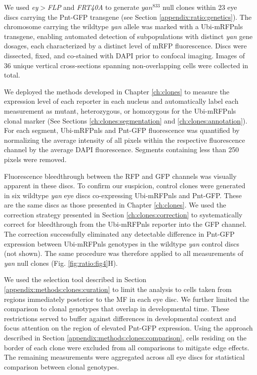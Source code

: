 We used \textit{ey$>$FLP} and \textit{FRT40A} to generate $yan^{833}$ null clones within 23 eye discs carrying the Pnt-GFP transgene (see Section \ref{appendix:ratio:genetics}). The chromosome carrying the wildtype \textit{yan} allele was marked with a Ubi-mRFPnls transgene, enabling automated detection of subpopulations with distinct \textit{yan} gene dosages, each characterized by a distinct level of mRFP fluorescence. Discs were dissected, fixed, and co-stained with DAPI prior to confocal imaging. Images of 36 unique vertical cross-sections spanning non-overlapping cells were collected in total. 

We deployed the methods developed in Chapter \ref{ch:clones} to measure the expression level of each reporter in each nucleus and automatically label each measurement as mutant, heterozygous, or homozygous for the Ubi-mRFPnls clonal marker (See Sections \ref{ch:clones:segmentation} and \ref{ch:clones:annotation}). For each segment, Ubi-mRFPnls and Pnt-GFP fluorescence was quantified by normalizing the average intensity of all pixels within the respective fluorescence channel by the average DAPI fluorescence. Segments containing less than 250 pixels were removed. 

Fluorescence bleedthrough between the RFP and GFP channels was visually apparent in these discs. To confirm our suspicion, control clones were generated in six wildtype \textit{yan} eye discs co-expressing Ubi-mRFPnls and Pnt-GFP. These are the same discs as those presented in Chapter \ref{ch:clones}. We used the correction strategy presented in Section \ref{ch:clones:correction} to systematically correct for bleedthrough from the Ubi-mRFPnls reporter into the GFP channel. The correction successfully eliminated any detectable difference in Pnt-GFP expression between Ubi-mRFPnls genotypes in the wildtype \textit{yan} control discs (not shown). The same procedure was therefore applied to all measurements of \textit{yan} null clones (Fig. \ref{fig:ratio:fig4}H).

We used the selection tool described in Section \ref{appendix:methods:clones:curation} to limit the analysis to cells taken from regions immediately posterior to the MF in each eye disc. We further limited the comparison to clonal genotypes that overlap in developmental time. These restrictions served to buffer against differences in developmental context and focus attention on the region of elevated Pnt-GFP expression. Using the approach described in Section \ref{appendix:methods:clones:comparison}, cells residing on the border of each clone were excluded from all comparisons to mitigate edge effects. The remaining measurements were aggregated across all eye discs for statistical comparison between clonal genotypes.

